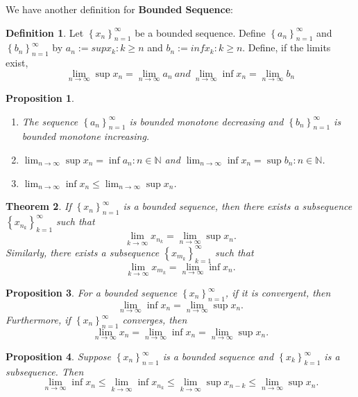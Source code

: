 \documentclass{article}
\newtheorem{theorem}{Theorem}[section]
\newtheorem{prop}[theorem]{Proposition}
\theoremstyle{definition}
\newtheorem{defi}{Definition}[section]
\begin{document}
We have another definition for \textbf{Bounded Sequence}:
\begin{defi}
Let $\left\{x_{n}\right\}_{n=1}^{\infty}$ be a bounded sequence. Define $\left\{a_{n}\right\}_{n=1}^{\infty}$ and $\left\{b_{n}\right\}_{n=1}^{\infty}$ by $a_{n}:=sup{x_{k}:k\geq n}$ and 
$b_{n}:=inf{x_{k}:k\geq n}$. Define, if the limits exist,
$$\lim_{n\rightarrow \infty}\sup x_{n} =\lim_{n\rightarrow \infty} a_{n}\ and\ \lim_{n\rightarrow \infty}\inf x_{n} =\lim_{n\rightarrow \infty} b_{n}$$
\end{defi}    

\begin{prop}
    \begin{enumerate}
        \item The sequence $\left\{a_{n}\right\}_{n=1}^{\infty}$ is bounded monotone decreasing and 
        $\left\{b_{n}\right\}_{n=1}^{\infty}$ is bounded monotone increasing.
        \item $\lim_{n\rightarrow \infty}\sup x_{n}=\inf{a_{n}:n\in\mathbb{N}}$ and $\lim_{n\to\infty}\inf x_{n}=\sup{b_{n}:n\in\mathbb{N}}$.
        \item $\lim_{n\to\infty}\inf x_{n}\leq \lim_{n\to\infty}\sup x_{n}$.
    \end{enumerate}
\end{prop}

\begin{theorem}
    If $\left\{x_{n}\right\}_{n=1}^{\infty}$ is a bounded sequence, then there exists a subsequence 
    $\left\{x_{n_{k}}\right\}_{k=1}^{\infty}$ such that 
    $$\lim_{k\to\infty}x_{n_{k}}=\lim_{n\to\infty}\sup x_{n}.$$
    Similarly, there exists a subsequence $\left\{x_{m_{k}}\right\}_{k=1}^{\infty}$ such that
    $$\lim_{k\to\infty}x_{m_{k}}=\lim_{n\to\infty}\inf x_{n}.$$
\end{theorem}

\begin{prop}
    For a bounded sequence $\left\{x_{n}\right\}_{n=1}^{\infty}$, if it is convergent, then 
    $$\lim_{n\to\infty} \inf x_{n}=\lim_{n\to\infty} \sup x_{n}.$$
    Furthermore, if $\left\{x_{n}\right\}_{n=1}^{\infty}$ converges, then 
    $$\lim_{n\to\infty} x_{n}=\lim_{n\to\infty} \inf x_{n} = \lim_{n\to\infty} \sup x_{n}.$$
\end{prop}

\begin{prop}
Suppose $\left\{x_{n}\right\}_{n=1}^{\infty}$ is a bounded sequence and $\left\{x_{k}\right\}_{k=1}^{\infty}$ is a subsequence.
Then 
$$\lim_{n\to\infty} \inf x_{n}\leq \lim_{k\to\infty} \inf x_{n_{k}} \leq \lim_{k\to\infty} \sup x_{n-{k}} \leq \lim_{n\to\infty} \sup x_{n}.$$ 
\end{prop}
\end{document}
